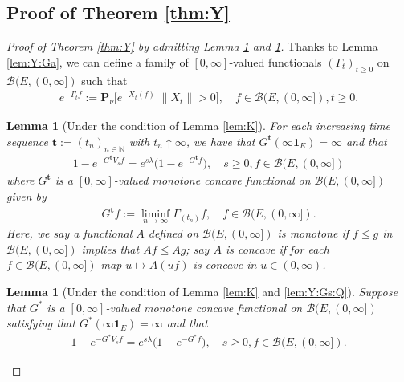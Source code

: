 \documentclass[12pt,a4paper]{amsart}
\numberwithin{equation}{section}
\theoremstyle{plain}
\newtheorem{lem}[thm]{Lemma}
\theoremstyle{definition}
\begin{document}
\subsection{Proof of Theorem \ref{thm:Y}}
\begin{proof}[Proof of Theorem \ref{thm:Y} by admitting Lemma \ref{lem:Y:Gt} and \ref{lem:Y:Gs}]

Thanks to Lemma \ref{lem:Y:Ga}, we can define a family of $[0,\infty]$-valued functionals $(\Gamma_t)_{t\geq 0}$ on $\mathcal B(E, (0,\infty])$ such that
\begin{align}
  e^{-\Gamma_t f}:= \mathbf P_{\nu}\big[e^{- X_t(f)}\big| \|X_t\| > 0\big], 
  \quad f\in \mathcal B(E,(0,\infty]), t \geq 0.
\end{align}
\begin{lem}[Under the condition of Lemma \ref{lem:K}]
  \label{lem:Y:Gt}
  For each increasing time sequence $\mathbf t:= (t_n)_{n\in \mathbb N}$ with $ t_n \uparrow \infty$, we have that $G^{\mathbf t}(\infty \mathbf 1_E) = \infty$ and that 
  \begin{align}
    1 - e^{- G^{\mathbf t}V_sf} 
    = e^{s\lambda} \big(1- e^{- G^{\mathbf t} f}\big),
    \quad s \geq 0, f \in \mathcal B(E, (0,\infty])
  \end{align}
  where $G^{\mathbf t}$ is a $[0,\infty]$-valued monotone concave functional on $\mathcal B(E,(0,\infty])$ given by
  \begin{align}
    G^{\mathbf t}f 
    := \liminf_{n\to \infty} \Gamma_{(t_n)}f,
    \quad f\in \mathcal B(E, (0,\infty]).
  \end{align}
  Here, we say a functional $A$ defined on $\mathcal B(E,(0,\infty])$ is monotone if $f\leq g$ in $\mathcal B(E,(0,\infty])$ implies that $Af\leq Ag$; say $A$ is concave if for each $f\in \mathcal B(E,(0,\infty])$ map $u\mapsto A(uf)$ is concave in $u \in (0, \infty)$.  
\end{lem}
\begin{lem}[Under the condition of Lemma \ref{lem:K} and \ref{lem:Y:Gs:Q}]
  \label{lem:Y:Gs}
  Suppose that $G^*$ is a $[0,\infty]$-valued monotone concave functional on $\mathcal B(E,(0,\infty])$ satisfying that $G^*(\infty \mathbf 1_E) = \infty$ and that 
  \begin{align}
    1 - e^{- G^* V_sf} = e^{s\lambda} \big(1- e^{- G^* f}\big),
    \quad s \geq 0, f \in \mathcal B(E, (0,\infty]).
  \end{align}

\end{lem}
\end{proof}
\end{document}

